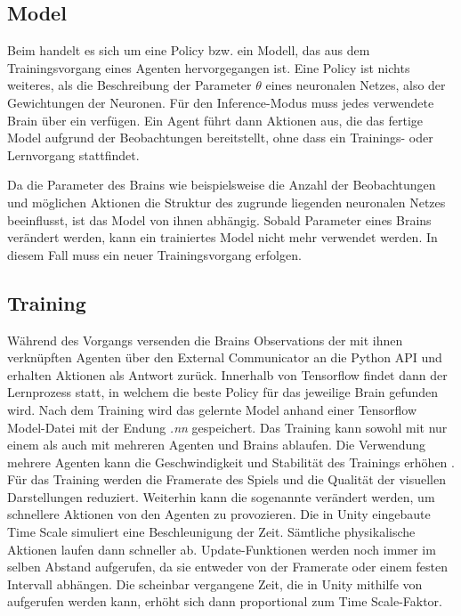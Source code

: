 \subsection{Model}
Beim  handelt es sich um eine Policy bzw. ein Modell, das aus dem Trainingsvorgang eines Agenten hervorgegangen ist. Eine Policy ist nichts weiteres, als die Beschreibung der Parameter $\theta$ eines neuronalen Netzes, also der Gewichtungen der Neuronen. Für den Inference-Modus muss jedes verwendete Brain über ein  verfügen. Ein Agent führt dann Aktionen aus, die das fertige Model aufgrund der Beobachtungen bereitstellt, ohne dass ein Trainings- oder Lernvorgang stattfindet.

Da die Parameter des Brains wie beispielsweise die Anzahl der Beobachtungen und möglichen Aktionen die Struktur des zugrunde liegenden neuronalen Netzes beeinflusst, ist das Model von ihnen abhängig. Sobald Parameter eines Brains verändert werden, kann ein trainiertes Model nicht mehr verwendet werden. In diesem Fall muss ein neuer Trainingsvorgang erfolgen.



\subsection{Training}
Während des Vorgangs versenden die Brains Observations der mit ihnen verknüpften Agenten über den External Communicator an die Python API und erhalten Aktionen als Antwort zurück. Innerhalb von Tensorflow findet dann der Lernprozess statt, in welchem die beste Policy für das jeweilige Brain gefunden wird. Nach dem Training wird das gelernte Model anhand einer Tensorflow Model-Datei mit der Endung \textit{.nn} gespeichert. Das Training kann sowohl mit nur einem als auch mit mehreren Agenten und Brains ablaufen. Die Verwendung mehrere Agenten kann die Geschwindigkeit und Stabilität des Trainings erhöhen \cite{ml-agents_documentation}. Für das Training werden die Framerate des Spiels und die Qualität der visuellen Darstellungen reduziert. Weiterhin kann die sogenannte  verändert werden, um schnellere Aktionen von den Agenten zu provozieren. Die in Unity eingebaute Time Scale simuliert eine Beschleunigung der Zeit. Sämtliche physikalische Aktionen laufen dann schneller ab. Update-Funktionen werden noch immer im selben Abstand aufgerufen, da sie entweder von der Framerate oder einem festen Intervall abhängen. Die scheinbar vergangene Zeit, die in Unity mithilfe von  aufgerufen werden kann, erhöht sich dann proportional zum Time Scale-Faktor. 

